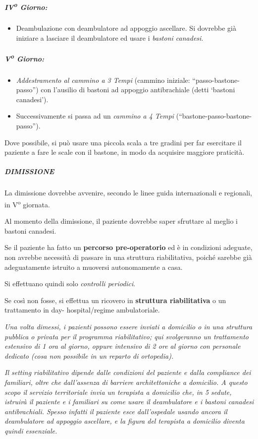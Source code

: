 \subparagraph{IV\textsuperscript{o} Giorno:}


\begin{itemize}
\item
  Deambulazione con deambulatore ad appoggio ascellare. Si dovrebbe già
  iniziare a lasciare il deambulatore ed usare i \emph{bastoni
  canadesi}.
\end{itemize}
\subparagraph{V\textsuperscript{o} Giorno:}


\begin{itemize}
\item
  \emph{Addestramento al cammino a 3 Tempi} (cammino iniziale:
  ``passo-bastone-passo'') con l'ausilio di bastoni ad appoggio antibrachiale (detti `bastoni
canadesi').
\item
  
  Successivamente si passa ad un \emph{cammino a 4 Tempi}
  (``bastone-passo-bastone- passo'').
  
\end{itemize}

Dove possibile, si può usare una piccola scala a tre gradini per far
esercitare il paziente a fare le scale con il bastone, in modo da
acquisire maggiore praticità.

\subparagraph{DIMISSIONE}


La dimissione dovrebbe avvenire, secondo le linee guida internazionali e
regionali, in V\textsuperscript{o} giornata.

Al momento della dimissione, il paziente dovrebbe saper sfruttare al
meglio i bastoni canadesi.

Se il paziente ha fatto un \textbf{percorso pre-operatorio} ed è in
condizioni adeguate, non avrebbe necessità di passare in una struttura
riabilitativa, poiché sarebbe già adeguatamente istruito a muoversi
autonomamente a casa.

Si effettuano quindi solo \emph{controlli periodici}.

Se così non fosse, si effettua un ricovero in \textbf{struttura
riabilitativa} o un trattamento in day- hospital/regime ambulatoriale.

\emph{Una volta dimessi, i pazienti possono essere inviati a domicilio o
in una struttura pubblica o privata per il programma riabilitativo; qui
svolgeranno un trattamento estensivo di 1 ora al giorno, oppure
intensivo di 2 ore al giorno con personale dedicato (cosa non possibile
in un reparto di ortopedia).}

\emph{Il setting riabilitativo dipende dalle condizioni del paziente e
dalla compliance dei familiari, oltre che dall'assenza di barriere
architettoniche a domicilio. A questo scopo il servizio territoriale
invia un terapista a domicilio che, in 5 sedute, istruirà il paziente e
i familiari su come usare il deambulatore e i bastoni canadesi
antibrachiali. Spesso infatti il paziente esce dall'ospedale usando
ancora il deambulatore ad appoggio ascellare, e la figura del terapista
a domicilio diventa quindi essenziale.}

